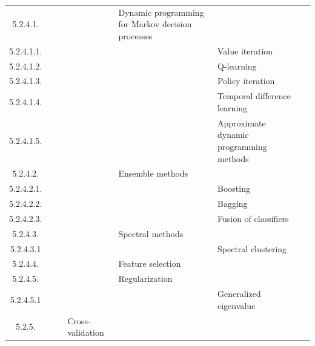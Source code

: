 \documentclass[12pt]{article}
\begin{document}
\begin{center}
{\begin{tabularx}{\linewidth}{|c|X|X|X|X|X|X|}
		5.2.4.1. &   &   &   &  Dynamic programming for Markov decision processes &   &   \\
		5.2.4.1.1. &   &   &   &   &  Value iteration &   \\
		5.2.4.1.2. &   &   &   &   &  Q-learning &   \\
		5.2.4.1.3. &   &   &   &   &  Policy iteration &   \\
		5.2.4.1.4. &   &   &   &   &  Temporal difference learning &   \\
		5.2.4.1.5. &   &   &   &   &  Approximate dynamic programming methods &   \\
		5.2.4.2. &   &   &   &  Ensemble methods &   &   \\
		5.2.4.2.1. &   &   &   &   &  Boosting &   \\
		5.2.4.2.2. &   &   &   &   &  Bagging &   \\
		5.2.4.2.3. &   &   &   &   &  Fusion of classifiers &   \\
		5.2.4.3. &   &   &   &  Spectral methods &   &   \\
		5.2.4.3.1 &   &   &   &   &  Spectral clustering &   \\
		5.2.4.4. &   &   &   &  Feature selection &   &   \\
		5.2.4.5. &   &   &   &  Regularization &   &   \\
		5.2.4.5.1 &   &   &   &   &  Generalized eigenvalue &   \\
		5.2.5. &   &   &  Cross-validation &   &   &   \\
	\end{tabularx}	}

\end{center}
\end{document}
